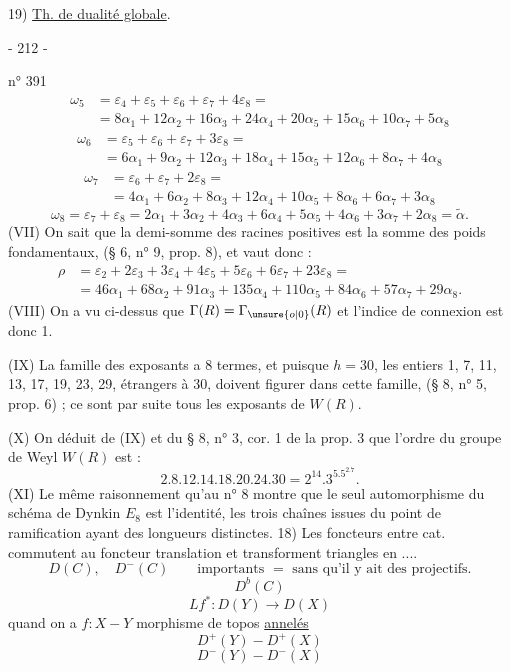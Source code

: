 19) \uline{Th. de dualité globale}.
\begin{center}- 212 -\end{center}
\hfill n° 391
\[
\begin{split}
\omega_5&=\varepsilon_4+\varepsilon_5+\varepsilon_6+\varepsilon_7+4\varepsilon_8=\\
&=8\alpha_1+12\alpha_2+16\alpha_3+24\alpha_4+20\alpha_5+15\alpha_6+10\alpha_7+5\alpha_8
\end{split}
\]
\[
\begin{split}
\omega_6&=\varepsilon_5+\varepsilon_6+\varepsilon_7+3\varepsilon_8=\\
&=6\alpha_1+9\alpha_2+12\alpha_3+18\alpha_4+15\alpha_5+12\alpha_6+8\alpha_7+4\alpha_8
\end{split}
\]
\[
\begin{split}
\omega_7&=\varepsilon_6+\varepsilon_7+2\varepsilon_8=\\
&=4\alpha_1+6\alpha_2+8\alpha_3+12\alpha_4+10\alpha_5+8\alpha_6+6\alpha_7+3\alpha_8
\end{split}
\]
\[
\omega_8=\varepsilon_7+\varepsilon_8=2\alpha_1+3\alpha_2+4\alpha_3+6\alpha_4+5\alpha_5+4\alpha_6+3\alpha_7+2\alpha_8=\widetilde\alpha.
\]
(VII) On sait que la demi-somme des racines positives est la somme des poids fondamentaux, (§ 6, n° 9, prop. 8), et vaut donc :
\[
\begin{split}
\rho&=\varepsilon_2+2\varepsilon_3+3\varepsilon_4+4\varepsilon_5+5\varepsilon_6+6\varepsilon_7+23\varepsilon_8=\\
&=46\alpha_1+68\alpha_2+91\alpha_3+135\alpha_4+110\alpha_5+84\alpha_6+57\alpha_7+29\alpha_8.
\end{split}
\]
(VIII) On a vu ci-dessus que $\Gamma(R)=\Gamma_{\unsure{o|0}}(R)$ et l'indice de connexion est donc 1.

(IX) La famille des exposants a 8 termes, et puisque $h=30$, les entiers 1, 7, 11, 13, 17, 19, 23, 29, étrangers à 30, doivent figurer dans cette famille, (§ 8, n° 5, prop. 6) ; ce sont par suite tous les exposants de $W(R)$.

(X) On déduit de (IX) et du § 8, n° 3, cor. 1 de la prop. 3 que l'ordre du groupe de Weyl $W(R)$ est :
\[
2.8.12.14.18.20.24.30=2^{14}.3^5.5^2.7.
\]
(XI) Le même raisonnement qu'au n° 8 montre que le seul automorphisme du schéma de Dynkin $E_8$ est l'identité, les trois chaînes issues du point de ramification ayant des longueurs distinctes.
18) Les foncteurs entre cat.   commutent au foncteur translation et transforment triangles  en  ....
\[
D(C),\quad D^-(C)\qquad\text{importants }=\text{ sans qu'il y ait des projectifs.}
\]
\[
D^b(C)
\]
\[
Lf^*:D(Y)\longrightarrow D(X)
\]
quand on a $f:X\mathbin{-}Y$ morphisme  de topos \uline{annelés}
\[
D^+(Y)\mathbin{-}D^+(X)
\]
\[
D^-(Y)\mathbin{-}D^-(X)
\]

